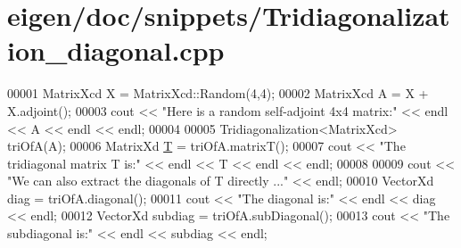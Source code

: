 \hypertarget{eigen_2doc_2snippets_2_tridiagonalization__diagonal_8cpp_source}{}\section{eigen/doc/snippets/\+Tridiagonalization\+\_\+diagonal.cpp}
\label{eigen_2doc_2snippets_2_tridiagonalization__diagonal_8cpp_source}

\begin{DoxyCode}
00001 MatrixXcd X = MatrixXcd::Random(4,4);
00002 MatrixXcd A = X + X.adjoint();
00003 cout << \textcolor{stringliteral}{"Here is a random self-adjoint 4x4 matrix:"} << endl << A << endl << endl;
00004 
00005 Tridiagonalization<MatrixXcd> triOfA(A);
00006 MatrixXd \hyperlink{group___sparse_core___module_class_eigen_1_1_triplet}{T} = triOfA.matrixT();
00007 cout << \textcolor{stringliteral}{"The tridiagonal matrix T is:"} << endl << T << endl << endl;
00008 
00009 cout << \textcolor{stringliteral}{"We can also extract the diagonals of T directly ..."} << endl;
00010 VectorXd diag = triOfA.diagonal();
00011 cout << \textcolor{stringliteral}{"The diagonal is:"} << endl << diag << endl; 
00012 VectorXd subdiag = triOfA.subDiagonal();
00013 cout << \textcolor{stringliteral}{"The subdiagonal is:"} << endl << subdiag << endl;
\end{DoxyCode}
